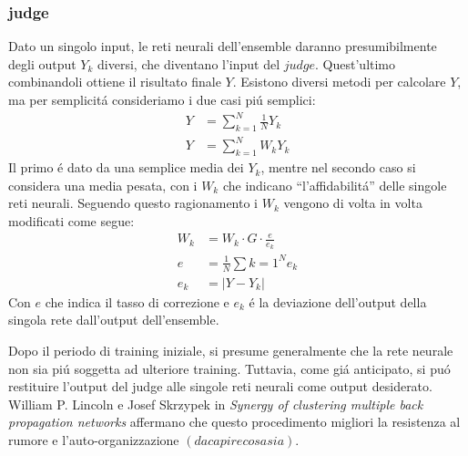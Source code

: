 \documentclass[a4paper,10pt]{article}
\begin{document}
 \subsubsection{judge}
 
 Dato un singolo input, le reti neurali dell'ensemble daranno presumibilmente degli output $Y_k$ diversi, che diventano l'input del $judge$. Quest'ultimo combinandoli ottiene il risultato finale $Y$. Esistono diversi metodi per calcolare $Y$, ma per semplicit\'a consideriamo i due casi pi\'u semplici:
 \begin{align}
  Y &= \sum_{k=1}^N \frac{1}{N} Y_k \\
  Y &= \sum_{k=1}^N W_k Y_k
 \end{align}
 Il primo \'e dato da una semplice media dei $Y_k$, mentre nel secondo caso si considera una media pesata, con i $W_k$ che indicano ``l'affidabilit\'a'' delle singole reti neurali. Seguendo questo ragionamento i $W_k$ vengono di volta in volta modificati come segue:
 \begin{align}
  W_k &= W_k \cdot G \cdot \frac{e}{e_k} \label{JudgeWeights} \\
  e &= \frac{1}{N} \sum{k=1}^N e_k \\
  e_k &= \left | Y - Y_k \right |
 \end{align}
 Con $e$ che indica il tasso di correzione e $e_k$ \'e la deviazione dell'output della singola rete dall'output dell'ensemble.
 
 Dopo il periodo di training iniziale, si presume generalmente che la rete neurale non sia pi\'u soggetta ad ulteriore training. Tuttavia, come gi\'a anticipato, si pu\'o restituire l'output del judge alle singole reti neurali come output desiderato. William P. Lincoln e Josef Skrzypek in \textit{Synergy of clustering multiple back propagation networks} affermano che questo procedimento migliori la resistenza al rumore e l'auto-organizzazione $(da capire cosa sia)$.
  
\end{document}

